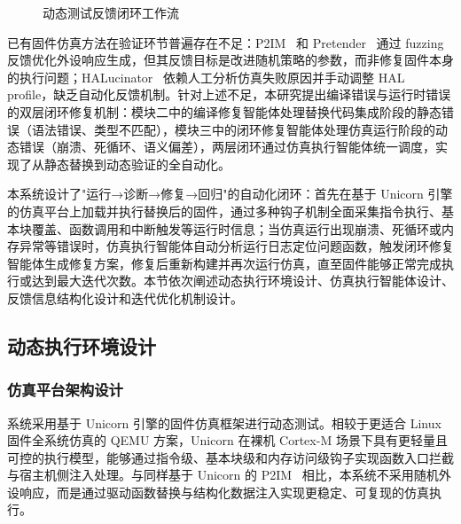 \begin{figure}[htbp]
\caption{动态测试反馈闭环工作流}
\label{fig:feedback-loop-workflow}
\end{figure}

已有固件仿真方法在验证环节普遍存在不足：P2IM~\cite{fengp2020p2im} 和 Pretender~\cite{pretender} 通过 fuzzing 反馈优化外设响应生成，但其反馈目标是改进随机策略的参数，而非修复固件本身的执行问题；HALucinator~\cite{clements2020halucinator} 依赖人工分析仿真失败原因并手动调整 HAL profile，缺乏自动化反馈机制。针对上述不足，本研究提出编译错误与运行时错误的双层闭环修复机制：模块二中的编译修复智能体处理替换代码集成阶段的静态错误（语法错误、类型不匹配），模块三中的闭环修复智能体处理仿真运行阶段的动态错误（崩溃、死循环、语义偏差），两层闭环通过仿真执行智能体统一调度，实现了从静态替换到动态验证的全自动化。

本系统设计了"运行→诊断→修复→回归"的自动化闭环：首先在基于 Unicorn 引擎的仿真平台上加载并执行替换后的固件，通过多种钩子机制全面采集指令执行、基本块覆盖、函数调用和中断触发等运行时信息；当仿真运行出现崩溃、死循环或内存异常等错误时，仿真执行智能体自动分析运行日志定位问题函数，触发闭环修复智能体生成修复方案，修复后重新构建并再次运行仿真，直至固件能够正常完成执行或达到最大迭代次数。本节依次阐述动态执行环境设计、仿真执行智能体设计、反馈信息结构化设计和迭代优化机制设计。

\subsection{动态执行环境设计}

\subsubsection{仿真平台架构设计}

系统采用基于 Unicorn 引擎的固件仿真框架进行动态测试。相较于更适合 Linux 固件全系统仿真的 QEMU 方案，Unicorn 在裸机 Cortex-M 场景下具有更轻量且可控的执行模型，能够通过指令级、基本块级和内存访问级钩子实现函数入口拦截与宿主机侧注入处理。与同样基于 Unicorn 的 P2IM~\cite{fengp2020p2im} 相比，本系统不采用随机外设响应，而是通过驱动函数替换与结构化数据注入实现更稳定、可复现的仿真执行。

